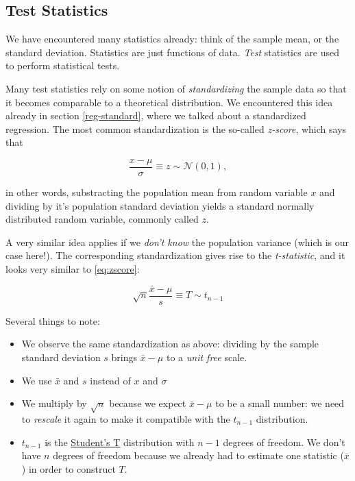 \documentclass[]{book}
\providecommand{\tightlist}{%
  \setlength{\itemsep}{0pt}\setlength{\parskip}{0pt}}
\begin{document}
\hypertarget{test-statistics}{%
\subsection{Test Statistics}\label{test-statistics}}

We have encountered many statistics already: think of the sample mean, or the standard deviation. Statistics are just functions of data. \emph{Test} statistics are used to perform statistical tests.

Many test statistics rely on some notion of \emph{standardizing} the sample data so that it becomes comparable to a theoretical distribution. We encountered this idea already in section \ref{reg-standard}, where we talked about a standardized regression. The most common standardization is the so-called \emph{z-score}, which says that

\begin{equation}
\frac{x - \mu}{\sigma}\equiv z\sim \mathcal{N}(0,1), \label{eq:zscore}
\end{equation}

in other words, substracting the population mean from random variable \(x\) and dividing by it's population standard deviation yields a standard normally distributed random variable, commonly called \(z\).

A very similar idea applies if we \emph{don't know} the population variance (which is our case here!). The corresponding standardization gives rise to the \emph{t-statistic}, and it looks very similar to \eqref{eq:zscore}:

\begin{equation}
\sqrt{n} \frac{\bar{x} - \mu}{s} \equiv T \sim t_{n-1} \label{eq:tscore}
\end{equation}

Several things to note:

\begin{itemize}
\tightlist
\item
  We observe the same standardization as above: dividing by the sample standard deviation \(s\) brings \(\bar{x} - \mu\) to a \emph{unit free} scale.
\item
  We use \(\bar{x}\) and \(s\) instead of \(x\) and \(\sigma\)
\item
  We multiply by \(\sqrt{n}\) because we expect \(\bar{x} - \mu\) to be a small number: we need to \emph{rescale} it again to make it compatible with the \(t_{n-1}\) distribution.
\item
  \(t_{n-1}\) is the \href{https://en.wikipedia.org/wiki/Student's_t-distribution}{Student's T} distribution with \(n-1\) degrees of freedom. We don't have \(n\) degrees of freedom because we already had to estimate one statistic (\(\bar{x}\)) in order to construct \(T\).
\end{itemize}
\end{document}
